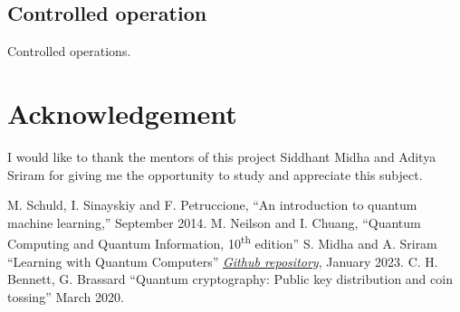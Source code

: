 \documentclass[conference]{IEEEtran}
\begin{document}
\subsection{Controlled operation}
Controlled operations. 

\section*{Acknowledgement}
I would like to thank the mentors of this project Siddhant Midha and Aditya Sriram for giving 
me the opportunity to study and appreciate this subject. 

\begin{thebibliography}{00}
 M. Schuld, I. Sinayskiy and F. Petruccione, ``An introduction to quantum machine learning,'' September 2014.
 M. Neilson and I. Chuang, ``Quantum Computing and Quantum Information, 10\textsuperscript{th} edition''
 S. Midha and A. Sriram ``Learning with Quantum Computers'' \href{https://github.com/siddhant-midha/WiDS-22-Learning-with-quantum-computers-}{\textit{Github repository}}, January 2023.
 C. H. Bennett, G. Brassard ``Quantum cryptography: Public key distribution and coin tossing'' March 2020.
\end{thebibliography}
\vspace{12pt}
\end{document}
